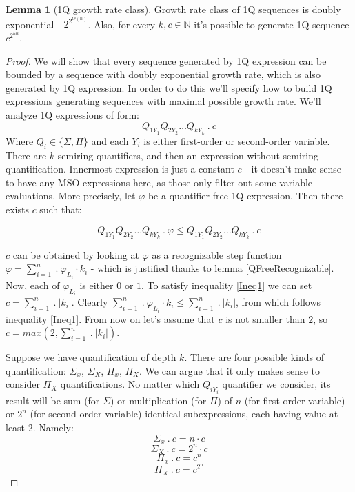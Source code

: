 \documentclass[12pt]{article}
\theoremstyle{definition}
\newtheorem{lemma}[theorem]{Lemma}
\begin{document}
\begin{lemma}[1Q growth rate class]
    Growth rate class of 1Q sequences is doubly exponential - $2^{2^{O(n)}}$. Also, for every $k, c \in \mathbb{N}$ it's possible to generate 1Q sequence $c^{2^{kn}}$.
\end{lemma}

\begin{proof}
    We will show that every sequence generated by 1Q expression can be bounded by a sequence with doubly exponential growth rate, which is also generated by 1Q expression. In order to do this we'll specify how to build 1Q expressions generating sequences with maximal possible growth rate. We'll analyze 1Q expressions of form:
    $$Q_{1Y_1}Q_{2Y_2} \ldots Q_{kY_k} \ . \ c$$
    Where $Q_i \in \{ \Sigma, \Pi \}$ and each $Y_i$ is either first-order or second-order variable. There are $k$ semiring quantifiers, and then an expression without semiring quantification. Innermost expression is just a constant $c$ - it doesn't make sense to have any MSO expressions here, as those only filter out some variable evaluations. More precisely, let $\varphi$ be a quantifier-free 1Q expression. Then there exists $c$ such that:

    \begin{equation}
    \label{Ineq1}
        Q_{1Y_1}Q_{2Y_2} \ldots Q_{kY_k} \ . \ \varphi \leq Q_{1Y_1}Q_{2Y_2} \ldots Q_{kY_k} \ . \ c   
    \end{equation}

    $c$ can be obtained by looking at $\varphi$ as a recognizable step function $\varphi = \sum_{i = 1}^{n} \ . \ \varphi_{L_i} \cdot k_i$ - which is justified thanks to lemma \ref{QFreeRecognizable}. Now, each of $\varphi_{L_i}$ is either $0$ or $1$. To satisfy inequality \ref{Ineq1} we can set $c = \sum_{i=1}^n \ . \ |k_i|$. Clearly $\sum_{i = 1}^{n} \ . \ \varphi_{L_i} \cdot k_i \leq  \sum_{i=1}^n \ . \ |k_i|$, from which follows inequality \ref{Ineq1}. From now on let's assume that $c$ is not smaller than $2$, so $c = max(2, \sum_{i=1}^n \ . \ |k_i|)$.

    Suppose we have quantification of depth $k$. There are four possible kinds of quantification: $\Sigma_x$, $\Sigma_X$, $\Pi_x$, $\Pi_X$. We can argue that it only makes sense to consider $\Pi_X$ quantifications. No matter which $Q_{iY_i}$ quantifier we consider, its result will be sum (for $\Sigma$) or multiplication (for $\Pi$) of $n$ (for first-order variable) or $2^n$ (for second-order variable) identical subexpressions, each having value at least 2. Namely:
    $$\Sigma_x \ . \ c = n \cdot c$$
    $$\Sigma_X \ . \ c = 2^n \cdot c$$
    $$\Pi_x \ . \ c = c^n$$
    $$\Pi_X \ . \ c = c^{2^n}$$


\end{proof}
\end{document}
